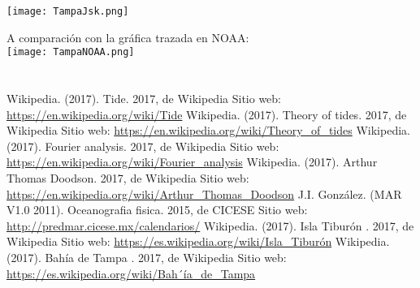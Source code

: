 \documentclass[12pt]{article}
\begin{document}
\begin{center}
\texttt{[image: TampaJsk.png]}
\end{center}

A comparaci\'on con la gr\'afica trazada en NOAA:
\\
\texttt{[image: TampaNOAA.png]}

\section*{}

\begin{thebibliography}{2}
 Wikipedia. (2017). Tide. 2017, de Wikipedia Sitio web: \url{https://en.wikipedia.org/wiki/Tide}
 Wikipedia. (2017). Theory of tides. 2017, de Wikipedia Sitio web: \url{https://en.wikipedia.org/wiki/Theory_of_tides}
 Wikipedia. (2017). Fourier analysis. 2017, de Wikipedia Sitio web: \url{https://en.wikipedia.org/wiki/Fourier_analysis}
 Wikipedia. (2017). Arthur Thomas Doodson. 2017, de Wikipedia Sitio web: \url{https://en.wikipedia.org/wiki/Arthur_Thomas_Doodson}
 J.I. González. (MAR V1.0 2011). Oceanografia fisica. 2015, de CICESE Sitio web: \url{http://predmar.cicese.mx/calendarios/}
 Wikipedia. (2017). Isla Tibur\'on . 2017, de Wikipedia Sitio web: \url{https://es.wikipedia.org/wiki/Isla_Tiburón}
 Wikipedia. (2017). Bahía de Tampa . 2017, de Wikipedia Sitio web: \url{https://es.wikipedia.org/wiki/Bah´ía_de_Tampa}
\end{thebibliography}



\end{document}
